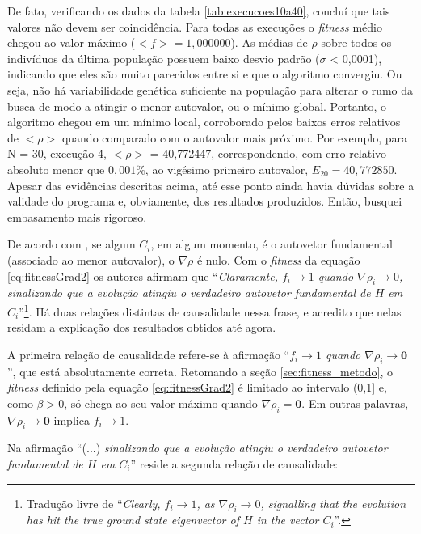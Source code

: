 	De fato, verificando os dados da tabela \ref{tab:execucoes10a40}, concluí que tais valores não devem ser coincidência. Para todas as execuções o \textit{fitness} médio chegou ao valor máximo \mbox{($<f> = 1,000000$)}. As médias de $\rho$ sobre todos os indivíduos da última população possuem baixo desvio padrão ($\sigma$ < 0,0001), indicando que eles são muito parecidos entre si e que o algoritmo convergiu. Ou seja, não há variabilidade genética suficiente na população para alterar o rumo da busca de modo a atingir o menor autovalor, ou o mínimo global. Portanto, o algoritmo chegou em um mínimo local, corroborado pelos baixos erros relativos de $<\rho>$ quando comparado com o autovalor mais próximo. Por exemplo, para N = 30, execução 4,  $<\rho>$ = 40,772447, correspondendo, com erro relativo absoluto menor que $0,001\%$, ao vigésimo primeiro autovalor, $E_{20} = 40,772850$. Apesar das evidências descritas acima, até esse ponto ainda havia dúvidas sobre a validade do programa e, obviamente, dos resultados produzidos. Então, busquei embasamento mais rigoroso.

De acordo com \cite{metodo2004}, se algum $C_i$, em algum momento, é o autovetor fundamental (associado ao menor autovalor), o $\nabla \rho$ é nulo. Com o \textit{fitness} da equação \eqref{eq:fitnessGrad2} os autores afirmam que ``\textit{Claramente, $f_i \rightarrow 1$ quando $\nabla \rho_i \rightarrow 0$, sinalizando que a evolução atingiu o verdadeiro autovetor fundamental de $H$ em $C_i$}''\footnote{Tradução livre de ``\textit{Clearly, $f_i \rightarrow 1$, as $\nabla \rho_i \rightarrow 0$, signalling that the evolution has hit the true ground state eigenvector of $H$ in the vector $C_i$}''.}. Há duas relações distintas de causalidade nessa frase, e acredito que nelas residam a explicação dos resultados obtidos até agora.

A primeira relação de causalidade refere-se à afirmação ``\textit{$f_i \rightarrow 1$ quando $\nabla \rho_i \rightarrow \textbf{0}$}'', que está absolutamente correta. Retomando a seção \ref{sec:fitness_metodo}, o \textit{fitness} definido pela equação \ref{eq:fitnessGrad2} é limitado ao intervalo (0,1] e, como $\beta > 0$, só chega ao seu valor máximo quando $\nabla \rho_i = \textbf{0}$. Em outras palavras, $\nabla \rho_i \rightarrow \textbf{0}$ implica $f_i \rightarrow 1$.

Na afirmação ``(...) \textit{sinalizando que a evolução atingiu o verdadeiro autovetor fundamental de $H$ em $C_i$}'' reside a segunda relação de causalidade:

